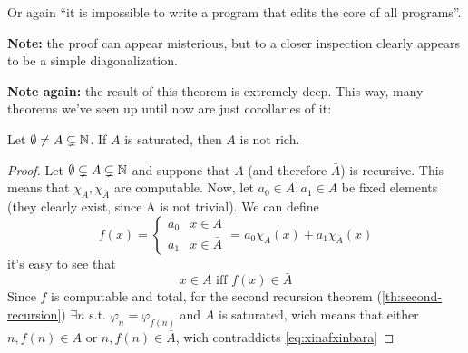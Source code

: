 Or again ``it is impossible to write a program that edits the core of
all programs''.

\textbf{Note:} the proof can appear misterious, but to a closer
inspection clearly appears to be a simple diagonalization.

\textbf{Note again:} the result of this theorem is extremely
deep. This way, many theorems we've seen up until now are just
corollaries of it:

\begin{theorem}
  Let $\emptyset \neq A \subsetneq \mathbb{N}$. If $A$ is saturated, then
  $A$ is not rich.
  \begin{proof}
    Let $\emptyset \subsetneq A \subsetneq \mathbb{N}$ and suppone that $A$
    (and therefore $\bar{A}$) is recursive. This means that
    $\chi_A, \chi_{\bar{A}}$ are computable. Now, let
    $a_0 \in \bar{A}, a_1 \in A$ be fixed elements (they clearly
    exist, since A is not trivial). We can define
    \[
      f(x) = \begin{cases}
        a_0 & x \in A \\
        a_1 & x \in \bar{A} 
      \end{cases} = a_0\chi_A(x) + a_1\chi_{\bar{A}}(x)
    \]
    it's  easy to see that
    \begin{equation}\label{eq:xinafxinbara}
      x\in A \mbox{ iff } f(x) \in \bar{A}
    \end{equation}
    Since $f$ is computable and total, for the second recursion
    theorem (\ref{th:second-recursion}) $\exists n$ s.t.
    $\varphi_n = \varphi_{f(n)}$ and $A$ is saturated, wich means that
    either $n, f(n) \in A$ or $n, f(n) \in \bar{A}$, wich contraddicts
    \ref{eq:xinafxinbara}
  \end{proof}
\end{theorem}
